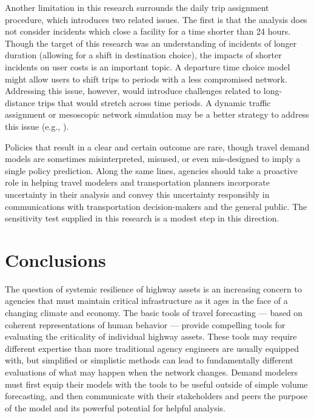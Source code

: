 \documentclass[]{ascelike-new}
\begin{document}
Another limitation in this research surrounds the daily trip assignment
procedure, which introduces two related issues. The first is that the
analysis does not consider incidents which close a facility for a time
shorter than 24 hours. Though the target of this research was an
understanding of incidents of longer duration (allowing for a shift in
destination choice), the impacts of shorter incidents on user costs is
an important topic. A departure time choice model might allow users to
shift trips to periods with a less compromised network. Addressing this
issue, however, would introduce challenges related to long-distance
trips that would stretch across time periods. A dynamic traffic
assignment or mesoscopic network simulation may be a better strategy to
address this issue (e.g., ).

Policies that result in a clear and certain outcome are rare, though
travel demand models are sometimes misinterpreted, misused, or even
mis-designed to imply a single policy prediction. Along the same lines,
agencies should take a proactive role in helping travel modelers and
transportation planners incorporate uncertainty in their analysis and
convey this uncertainty responsibly in communications with
transportation decision-makers and the general public. The sensitivity
test supplied in this research is a modest step in this direction.


\section{Conclusions}\label{conclusions}

The question of systemic resilience of highway assets is an increasing
concern to agencies that must maintain critical infrastructure as it
ages in the face of a changing climate and economy. The basic tools of
travel forecasting --- based on coherent representations of human
behavior --- provide compelling tools for evaluating the criticality of
individual highway assets. These tools may require different expertise
than more traditional agency engineers are usually equipped with, but
simplified or simplistic methods can lead to fundamentally different
evaluations of what may happen when the network changes. Demand modelers
must first equip their models with the tools to be useful outside of
simple volume forecasting, and then communicate with their stakeholders
and peers the purpose of the model and its powerful potential for
helpful analysis.
\end{document}

